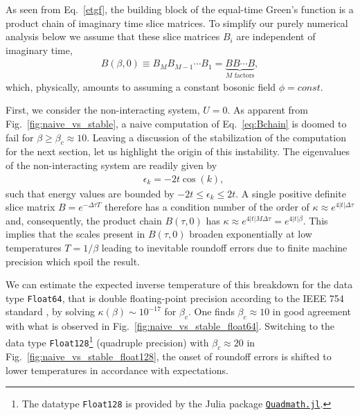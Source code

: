 \documentclass[submission, Phys]{SciPost}
\begin{document}
As seen from Eq.~\eqref{etgf}, the building block of the equal-time Green's function is a product chain of imaginary time slice matrices. To simplify our purely numerical analysis below we assume that these slice matrices $B_i$ are independent of imaginary time,
\begin{align}
	B(\beta, 0) \equiv B_M B_{M-1} \cdots B_1 = \underbrace{B B \cdots B}_{M \textrm{ factors}}, \label{eq:Bchain}
\end{align}
which, physically, amounts to assuming a constant bosonic field $\phi = \textit{const}$.

First, we consider the non-interacting system, $U=0$. As apparent from Fig.~\ref{fig:naive_vs_stable}, a naive computation of Eq.~\ref{eq:Bchain} is doomed to fail for $\beta \geq \beta_c \approx 10$. Leaving a discussion of the stabilization of the computation for the next section, let us highlight the origin of this instability. The eigenvalues of the non-interacting system are readily given by
\begin{align}
	&\epsilon_k = -2t\cos(k),
\end{align}
such that energy values are bounded by $-2t \leq \epsilon_k \leq 2t$. A single positive definite slice matrix $B = e^{-\Delta \tau T}$ therefore has a condition number of the order of $\kappa \approx e^{4|t|\Delta \tau}$ and, consequently, the product chain $B(\tau, 0)$ has $\kappa \approx e^{4|t|M\Delta \tau} = e^{4|t|\beta}$. This implies that the scales present in $B(\tau, 0)$ broaden exponentially at low temperatures $T=1/\beta$ leading to inevitable roundoff errors due to finite machine precision which spoil the result.

We can estimate the expected inverse temperature of this breakdown for the data type \texttt{Float64}, that is double floating-point precision according to the IEEE 754 standard \cite{Goldberg1991}, by solving $\kappa(\beta) \sim 10^{-17}$ for $\beta_c$. One finds $\beta_c \approx 10$ in good agreement with what is observed in Fig.~\ref{fig:naive_vs_stable_float64}. Switching to the data type \texttt{Float128}\footnote{The datatype \texttt{Float128} is provided by the Julia package \href{https://github.com/JuliaMath/Quadmath.jl}{\texttt{Quadmath.jl}}.} (quadruple precision) with $\beta_c \approx 20$ in Fig.~\ref{fig:naive_vs_stable_float128}, the onset of roundoff errors is shifted to lower temperatures in accordance with expectations.
\end{document}
